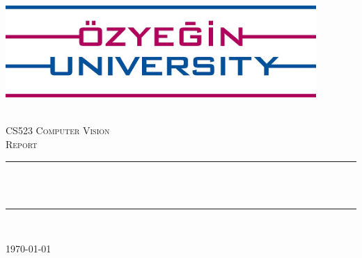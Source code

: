 \begin{titlepage}
\centering
\includegraphics[height=3.5cm]{images/ozu.jpg}\\[1cm]   
\begin{center}

~\\[1.5cm]

\textsc{\Large CS523 Computer Vision\\Report}\\[0.5cm]

\hrule ~\\[0.2cm]
{\huge \bfseries \mytitle}\\[0.4cm]		%
\hrule ~\\[1.5cm]

\begin{minipage}{0.4\textwidth}
    \centering
	\large
		\myauthor
\end{minipage}

\vfill

{\large \today}

\end{center}
\end{titlepage}
